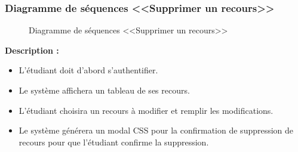 \documentclass[12pt]{report}
\begin{document}
\newpage

\subsubsection{Diagramme de séquences <<Supprimer un recours>>}

\begin{figure}[h]
\centering
    \centerline{}
    \caption{Diagramme de séquences <<Supprimer un recours>>}
\end{figure}

\vspace{0.2in}

\textbf{Description :}

\begin{itemize}
    \item L'étudiant doit d'abord s'authentifier.
    \item Le système affichera un tableau de ses recours.
    \item L'étudiant choisira un recours à modifier et remplir les modifications.
    \item Le système générera un modal CSS pour la confirmation de suppression de recours pour que l'étudiant confirme la suppression.
\end{itemize}
\end{document}
